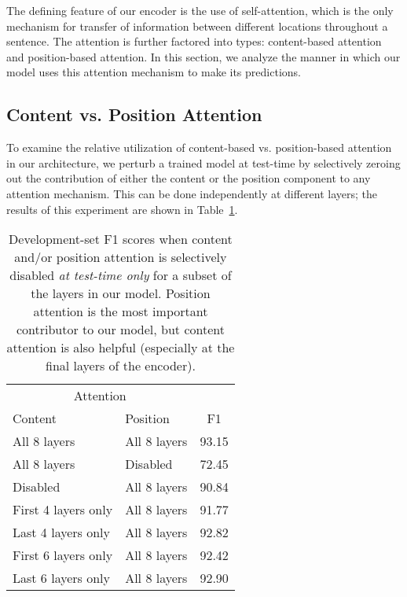 \documentclass[11pt,a4paper]{article}
\begin{document}
The defining feature of our encoder is the use of self-attention, which is the only mechanism for transfer of information between different locations throughout a sentence. The attention is further factored into types: content-based attention and position-based attention. In this section, we analyze the manner in which our model uses this attention mechanism to make its predictions.

\subsection{Content vs. Position Attention}

To examine the relative utilization of content-based vs. position-based attention in our architecture, we perturb a trained model at test-time by selectively zeroing out the contribution of either the content or the position component to any attention mechanism. This can be done independently at different layers; the results of this experiment are shown in Table~\ref{table:content-position-disable}.

\begin{table}[t!]
\begin{center}
\begin{tabular}{@{}llc@{}}
\toprule
\multicolumn{2}{c}{Attention}\\
\cmidrule{1-2}
Content & Position & F1\\
\midrule
All 8 layers & All 8 layers & 93.15 \\
All 8 layers & Disabled & 72.45 \\
Disabled & All 8 layers & 90.84 \\
First 4 layers only & All 8 layers & 91.77 \\
Last 4 layers only & All 8 layers & 92.82 \\
First 6 layers only & All 8 layers & 92.42 \\
Last 6 layers only & All 8 layers & 92.90 \\
\bottomrule
\end{tabular}
\end{center}
\caption{
\label{table:content-position-disable}
Development-set F1 scores when content and/or position attention is selectively disabled \emph{at test-time only} for a subset of the layers in our model. Position attention is the most important contributor to our model, but content attention is also helpful (especially at the final layers of the encoder).
}
\end{table}
\end{document}
